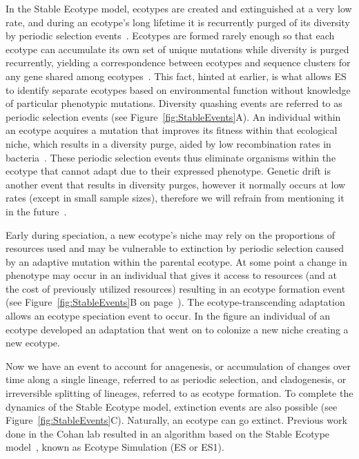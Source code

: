 In the Stable Ecotype model, ecotypes are created and extinguished at a very low rate, and during an ecotype's long lifetime it is recurrently purged of its diversity by periodic selection events~\cite{cohan2007systematics}.
Ecotypes are formed rarely enough so that each ecotype can accumulate its own set of unique mutations while diversity is purged recurrently, yielding a correspondence between ecotypes and sequence clusters for any gene shared among ecotypes~\cite{cohan2008origins}.
This fact, hinted at earlier, is what allows ES to identify separate ecotypes based on environmental function without knowledge of particular phenotypic mutations.
Diversity quashing events are referred to as periodic selection events (see Figure~\ref{fig:StableEvents}A).
An individual within an ecotype acquires a mutation that improves its fitness within that ecological niche, which results in a diversity purge, aided by low recombination rates in bacteria~\cite{koeppel2008identifying}.
These periodic selection events thus eliminate organisms within the ecotype that cannot adapt due to their expressed phenotype.
Genetic drift is another event that results in diversity purges, however it normally occurs at low rates (except in small sample sizes), therefore we will refrain from mentioning it in the future~\cite{koeppel2008identifying}.

Early during speciation, a new ecotype's niche may rely on the proportions of resources used and may be vulnerable to extinction by periodic selection caused by an adaptive mutation within the parental ecotype.
At some point a change in phenotype may occur in an individual that gives it access to resources (and at the cost of previously utilized resources) resulting in an ecotype formation event~\cite{cohan2008origins} (see Figure~\ref{fig:StableEvents}B on page~\pageref{fig:StableEvents}).
The ecotype-transcending adaptation allows an ecotype speciation event to occur.
In the figure an individual of an ecotype developed an adaptation that went on to colonize a new niche creating a new ecotype.

Now we have an event to account for anagenesis, or accumulation of changes over time along a single lineage, referred to as periodic selection, and cladogenesis, or irreversible splitting of lineages, referred to as ecotype formation.
To complete the dynamics of the Stable Ecotype model, extinction events are also possible (see Figure~\ref{fig:StableEvents}C).
Naturally, an ecotype can go extinct.
Previous work done in the Cohan lab resulted in an algorithm based on the Stable Ecotype model~\cite{koeppel2008identifying}, known as Ecotype Simulation (ES or ES1).


